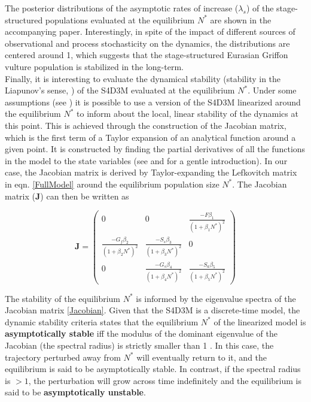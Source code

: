 \documentclass[12pt,a4paper]{article}
\begin{document}
The posterior distributions of the asymptotic rates of increase ($\lambda_{s}$) of the stage-structured populations evaluated at the equilibrium $N^*$ are shown in the accompanying paper. Interestingly, in spite of the impact of different sources of observational and process stochasticity on the dynamics, the distributions are centered around 1, which suggests that the stage-structured Eurasian Griffon vulture population is stabilized in the long-term. \\

Finally, it is interesting to evaluate the dynamical stability (stability in the Liapunov's sense, \cite{Elaydi2005}) of the S4D3M evaluated at the equilibrium $N^*$. Under some assumptions (see \cite{Caswell2001,Elaydi2005}) it is possible to use a version of the S4D3M linearized around the equilibrium $N^*$ to inform about the local, linear stability of the dynamics at this point. This is achieved through the construction of the Jacobian matrix, which is the first term of a Taylor expansion of an analytical function around a given point. It is constructed by finding the partial derivatives of all the functions in the model to the state variables (see \cite{Caswell2001} and \cite{Otto2011} for a gentle introduction). In our case, the Jacobian matrix is derived by Taylor-expanding the Lefkovitch matrix in eqn. \ref{FullModel} around the equilibrium population size $N^*$. The Jacobian matrix (\textbf{J}) can then be written as

\vspace{0.2in}

\begin{equation}\label{Jacobian}
	\mathbf{J} = \left(
	\begin{array}{ccc}
		{0} & {0} & {\frac{-F \beta_{1}}{(1 + \beta_{1} N^*)^2}} \\
		{\frac{-G_{f} \beta_{2}}{(1 + \beta_{2} N^*)^2}} & {\frac{-S_{s} \beta_{3}}{(1 + \beta_{3} N^*)^2}} & {0} \\
		{0} & {\frac{-G_{s} \beta_{4}}{(1 + \beta_{4} N^*)^2}} & {\frac{-S_{a} \beta_{5}}{(1 + \beta_{5} N^*)^2}}
	\end{array}\right)
\end{equation}

\vspace{0.2in}

The stability of the equilibrium $N^*$ is informed by the eigenvalue spectra of the Jacobian matrix \ref{Jacobian}. Given that the S4D3M is a discrete-time model, the dynamic stability criteria states that the equilibrium $N^*$ of the linearized model is \textbf{asymptotically stable} iff the modulus of the dominant eigenvalue of the Jacobian (the spectral radius) is strictly smaller than 1 \cite{Elaydi2005}. In this case, the trajectory perturbed away from $N^*$ will eventually return to it, and the equilibrium is said to be asymptotically stable. In contrast, if the spectral radius is $>1$, the perturbation will grow across time indefinitely and the equilibrium is said to be \textbf{asymptotically unstable}.\\
\end{document}
